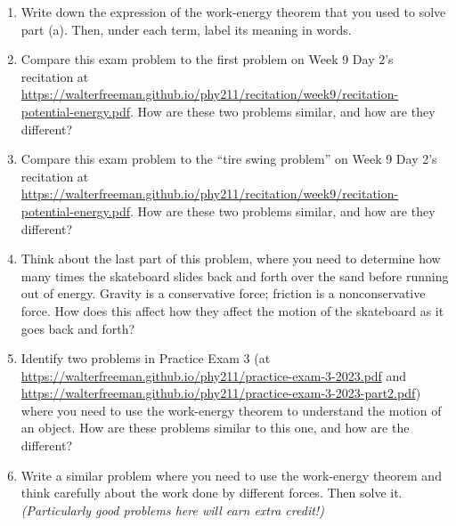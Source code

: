 \documentclass[12pt]{article}
\begin{document}
\begin{enumerate}
	
		\item Write down the expression of the work-energy theorem that you used to solve part (a). Then, under each term, label its meaning in words.
		
		\item Compare this exam problem to the first problem on Week 9 Day 2's recitation at {\url {https://walterfreeman.github.io/phy211/recitation/week9/recitation-potential-energy.pdf}}. How are these two problems similar, and how are they different?
		
		\item Compare this exam problem to the ``tire swing problem'' on Week 9 Day 2's recitation at {\url {https://walterfreeman.github.io/phy211/recitation/week9/recitation-potential-energy.pdf}}. How are these two problems similar, and how are they different?
		
		\item Think about the last part of this problem, where you need to determine how many times the skateboard slides back and forth over the sand before running out of energy. Gravity is a conservative force; friction is a nonconservative force. How does this affect how they affect the motion of the skateboard as it goes back and forth?

\item Identify two problems in Practice Exam 3 (at \url{https://walterfreeman.github.io/phy211/practice-exam-3-2023.pdf} and \url{https://walterfreeman.github.io/phy211/practice-exam-3-2023-part2.pdf}) where you need to use the work-energy theorem to understand the motion of an object. How are these problems similar to this one, and how are the different?
	
    \item Write a similar problem where you need to use the work-energy theorem and think carefully about the work done by different forces. Then solve it. {\it (Particularly good problems here will earn extra credit!)}
\end{enumerate}
\end{document}
